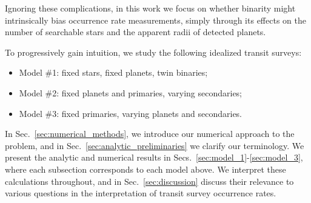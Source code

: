 Ignoring these complications, in this work we focus on whether
binarity might intrinsically bias occurrence rate measurements, simply 
through its effects on the number of searchable stars and the apparent radii 
of detected planets.

To progressively gain intuition, we study the following idealized transit 
surveys:
\begin{itemize}
    \item Model \#1: fixed stars, fixed planets, twin binaries;
    \item Model \#2: fixed planets and primaries, varying secondaries;
    \item Model \#3: fixed primaries, varying planets and secondaries.
\end{itemize}
In Sec.~\ref{sec:numerical_methods}, we introduce our numerical approach 
to the problem, and in Sec.~\ref{sec:analytic_preliminaries} we clarify our 
terminology.
We present the analytic and numerical results in 
Secs.~\ref{sec:model_1}-\ref{sec:model_3}, where each subsection corresponds 
to each model above.
We interpret these calculations throughout, and in 
Sec.~\ref{sec:discussion} discuss their relevance to various questions in 
the interpretation of transit survey occurrence rates. 